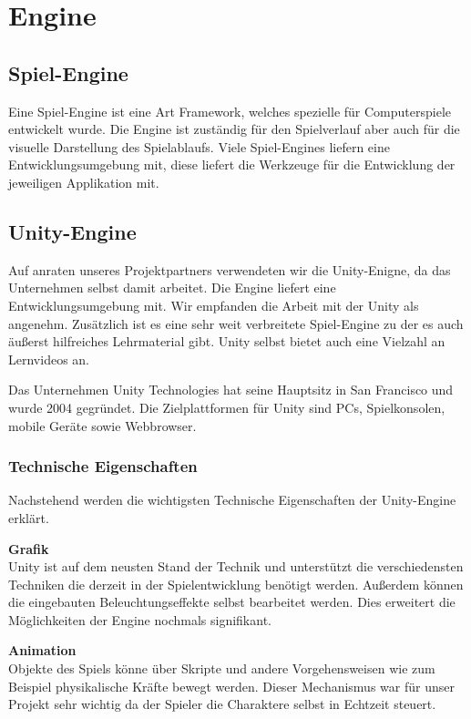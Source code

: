 \section{Engine}

\subsection{Spiel-Engine}
Eine Spiel-Engine ist eine Art Framework, welches spezielle für Computerspiele entwickelt wurde. Die Engine ist zuständig für den Spielverlauf aber auch für die visuelle Darstellung des Spielablaufs. Viele Spiel-Engines liefern eine Entwicklungsumgebung mit, diese liefert die Werkzeuge für die Entwicklung der jeweiligen Applikation mit. \cite{Spiel-Engine}

\subsection{Unity-Engine}
Auf anraten unseres Projektpartners verwendeten wir die Unity-Enigne, da das Unternehmen selbst damit arbeitet. Die Engine liefert eine Entwicklungsumgebung mit. Wir empfanden die Arbeit mit der Unity als angenehm. Zusätzlich ist es eine sehr weit verbreitete Spiel-Engine zu der es auch äußerst hilfreiches Lehrmaterial gibt. Unity selbst bietet auch eine Vielzahl an Lernvideos an.

Das Unternehmen Unity Technologies hat seine Hauptsitz in San Francisco und wurde 2004 gegründet. Die Zielplattformen für Unity sind PCs, Spielkonsolen, mobile Geräte sowie Webbrowser. \cite{Unity-Engine}

\subsubsection{Technische Eigenschaften}
Nachstehend werden die wichtigsten Technische Eigenschaften der Unity-Engine erklärt. 

\textbf{Grafik}\\
Unity ist auf dem neusten Stand der Technik und unterstützt die verschiedensten Techniken die derzeit in der Spielentwicklung benötigt werden. Außerdem können die eingebauten Beleuchtungseffekte selbst bearbeitet werden. Dies erweitert die Möglichkeiten der Engine nochmals signifikant.

\textbf{Animation}\\
Objekte des Spiels könne über Skripte und andere Vorgehensweisen wie zum Beispiel physikalische Kräfte bewegt werden. Dieser Mechanismus war für unser Projekt sehr wichtig da der Spieler die Charaktere selbst in Echtzeit steuert. 

